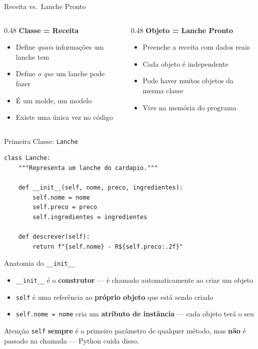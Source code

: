 \documentclass[aspectratio=169]{beamer}
\begin{document}
\begin{frame}{Receita vs.\ Lanche Pronto}
  \begin{columns}[T]
    \begin{column}{0.48\textwidth}
      \textbf{Classe = Receita}
      \begin{itemize}
        \item Define \emph{quais} informações um lanche tem
        \item Define \emph{o que} um lanche pode fazer
        \item É um molde, um modelo
        \item Existe uma única vez no código
      \end{itemize}
    \end{column}
    \begin{column}{0.48\textwidth}
      \textbf{Objeto = Lanche Pronto}
      \begin{itemize}
        \item Preenche a receita com dados reais
        \item Cada objeto é independente
        \item Pode haver muitos objetos da mesma classe
        \item Vive na memória do programa
      \end{itemize}
    \end{column}
  \end{columns}
\end{frame}

\begin{frame}[fragile]{Primeira Classe: \texttt{Lanche}}
  \begin{lstlisting}
class Lanche:
    """Representa um lanche do cardapio."""

    def __init__(self, nome, preco, ingredientes):
        self.nome = nome
        self.preco = preco
        self.ingredientes = ingredientes

    def descrever(self):
        return f"{self.nome} - R${self.preco:.2f}"
  \end{lstlisting}
\end{frame}

\begin{frame}{Anatomia do \texttt{\_\_init\_\_}}
  \begin{itemize}
    \item \texttt{\_\_init\_\_} é o \textbf{construtor} --- é chamado
          automaticamente ao criar um objeto
    \item \texttt{self} é uma referência ao \textbf{próprio objeto}
          que está sendo criado
    \item \texttt{self.nome = nome} cria um \textbf{atributo de instância}
          --- cada objeto terá o seu
  \end{itemize}

  \vspace{0.3cm}
  \begin{block}{Atenção}
    \texttt{self} \textbf{sempre} é o primeiro parâmetro de qualquer método,
    mas \textbf{não} é passado na chamada --- Python cuida disso.
  \end{block}
\end{frame}
\end{document}
